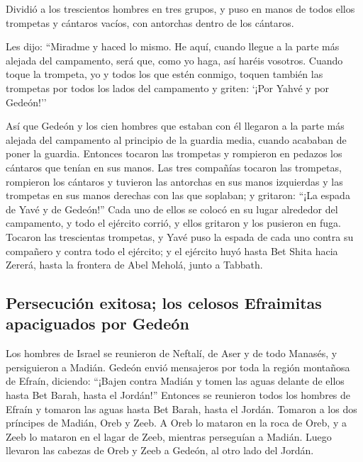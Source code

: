 Dividió a los trescientos hombres en tres grupos, y puso
en manos de todos ellos trompetas y cántaros vacíos, con antorchas
dentro de los cántaros.

 Les dijo: ``Miradme y haced lo mismo. He aquí, cuando
llegue a la parte más alejada del campamento, será que, como yo haga,
así haréis vosotros.  Cuando toque la trompeta, yo y
todos los que estén conmigo, toquen también las trompetas por todos los
lados del campamento y griten: `¡Por Yahvé y por Gedeón!''

 Así que Gedeón y los cien hombres que estaban con él
llegaron a la parte más alejada del campamento al principio de la
guardia media, cuando acababan de poner la guardia. Entonces tocaron las
trompetas y rompieron en pedazos los cántaros que tenían en sus manos.
 Las tres compañías tocaron las trompetas, rompieron los
cántaros y tuvieron las antorchas en sus manos izquierdas y las
trompetas en sus manos derechas con las que soplaban; y gritaron: ``¡La
espada de Yavé y de Gedeón!''  Cada uno de ellos se
colocó en su lugar alrededor del campamento, y todo el ejército corrió,
y ellos gritaron y los pusieron en fuga.  Tocaron las
trescientas trompetas, y Yavé puso la espada de cada uno contra su
compañero y contra todo el ejército; y el ejército huyó hasta Bet Shita
hacia Zererá, hasta la frontera de Abel Meholá, junto a Tabbath.

\hypertarget{persecuciuxf3n-exitosa-los-celosos-efraimitas-apaciguados-por-gedeuxf3n}{%
\subsection{Persecución exitosa; los celosos Efraimitas apaciguados por
Gedeón}\label{persecuciuxf3n-exitosa-los-celosos-efraimitas-apaciguados-por-gedeuxf3n}}

 Los hombres de Israel se reunieron de Neftalí, de Aser y
de todo Manasés, y persiguieron a Madián.  Gedeón envió
mensajeros por toda la región montañosa de Efraín, diciendo: ``¡Bajen
contra Madián y tomen las aguas delante de ellos hasta Bet Barah, hasta
el Jordán!'' Entonces se reunieron todos los hombres de Efraín y tomaron
las aguas hasta Bet Barah, hasta el Jordán.  Tomaron a
los dos príncipes de Madián, Oreb y Zeeb. A Oreb lo mataron en la roca
de Oreb, y a Zeeb lo mataron en el lagar de Zeeb, mientras perseguían a
Madián. Luego llevaron las cabezas de Oreb y Zeeb a Gedeón, al otro lado
del Jordán.

